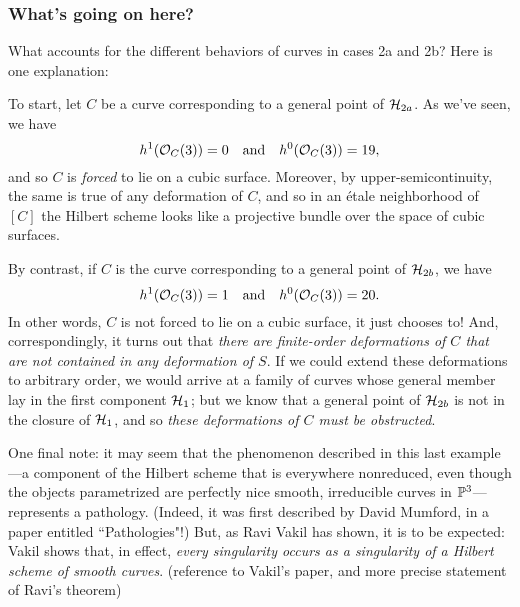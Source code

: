\subsubsection{What's going on here?}

What accounts for the different behaviors of curves in cases 2a and 2b? Here is one explanation:

To start, let $C$ be a curve corresponding to a general point of $\cH_{2a}$. As we've seen, we have
$$
h^1(\cO_C(3)) = 0 \quad \text{and} \quad h^0(\cO_C(3)) = 19,
$$
and so $C$ is \emph{forced} to lie on a cubic surface. Moreover, by upper-semicontinuity, the same is true of any deformation of $C$, and so in an \'etale neighborhood of $[C]$ the Hilbert scheme looks like a projective bundle over the space of cubic surfaces.

By contrast, if $C$ is the curve corresponding to a general point of $\cH_{2b}$, we have
$$
h^1(\cO_C(3)) = 1 \quad \text{and} \quad h^0(\cO_C(3)) = 20.
$$
In other words, $C$ is not forced to lie on a cubic surface, it just chooses to! And, correspondingly, it turns out that \emph{there are finite-order deformations of $C$ that are not contained in any deformation of $S$}. If we could extend these deformations to arbitrary order, we would arrive at a family of curves whose general member lay in the first component $\cH_1$; but we know that a general point of $\cH_{2b}$ is not in the closure of $\cH_1$, and so \emph{these deformations of $C$ must be obstructed}.

One final note: it may seem that the phenomenon described in this last example---a component of the Hilbert scheme that is everywhere nonreduced, even though the objects parametrized are perfectly nice smooth, irreducible curves in $\PP^3$---represents a pathology. (Indeed, it was first described by David Mumford, in a paper entitled ``Pathologies"!) But, as Ravi Vakil has shown, it is to be expected: Vakil shows that, in effect, \emph{every singularity occurs as a singularity of a Hilbert scheme of smooth curves}. (reference to Vakil's paper, and more precise statement of Ravi's theorem)
 
